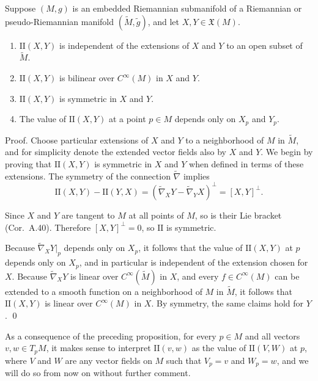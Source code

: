 \begin{proposition}
\label{prop:second-fundamental-form-properties}

Suppose $(M, g)$ is an embedded Riemannian submanifold of a Riemannian or pseudo-Riemannian manifold $(\tilde{M}, \tilde{g})$, and let $X, Y \in \mathfrak{X}(M)$.

\begin{enumerate}[label=(\alph*)]
\item $\text{II}(X, Y)$ is independent of the extensions of $X$ and $Y$ to an open subset of $\tilde{M}$.
\item $\text{II}(X, Y)$ is bilinear over $C^{\infty}(M)$ in $X$ and $Y$.
\item $\text{II}(X, Y)$ is symmetric in $X$ and $Y$.
\item The value of $\text{II}(X, Y)$ at a point $p \in M$ depends only on $X_p$ and $Y_p$.
\end{enumerate}
\end{proposition}

Proof. Choose particular extensions of $X$ and $Y$ to a neighborhood of $M$ in $\tilde{M}$, and for simplicity denote the extended vector fields also by $X$ and $Y$. We begin by proving that $\text{II}(X,Y)$ is symmetric in $X$ and $Y$ when defined in terms of these extensions. The symmetry of the connection $\tilde{\nabla}$ implies
\[
\text{II}(X,Y) - \text{II}(Y,X) = (\tilde{\nabla}_X Y - \tilde{\nabla}_Y X)^\perp = [X,Y]^\perp.
\]

Since $X$ and $Y$ are tangent to $M$ at all points of $M$, so is their Lie bracket (Cor.~A.40). Therefore $[X,Y]^\perp = 0$, so $\text{II}$ is symmetric.

Because $\tilde{\nabla}_X Y|_p$ depends only on $X_p$, it follows that the value of $\text{II}(X,Y)$ at $p$ depends only on $X_p$, and in particular is independent of the extension chosen for $X$. Because $\tilde{\nabla}_X Y$ is linear over $C^\infty(\tilde{M})$ in $X$, and every $f \in C^\infty(M)$ can be extended to a smooth function on a neighborhood of $M$ in $\tilde{M}$, it follows that $\text{II}(X,Y)$ is linear over $C^\infty(M)$ in $X$. By symmetry, the same claims hold for $Y$. \qed

As a consequence of the preceding proposition, for every $p \in M$ and all vectors $v,w \in T_p M$, it makes sense to interpret $\text{II}(v,w)$ as the value of $\text{II}(V,W)$ at $p$, where $V$ and $W$ are any vector fields on $M$ such that $V_p = v$ and $W_p = w$, and we will do so from now on without further comment.

